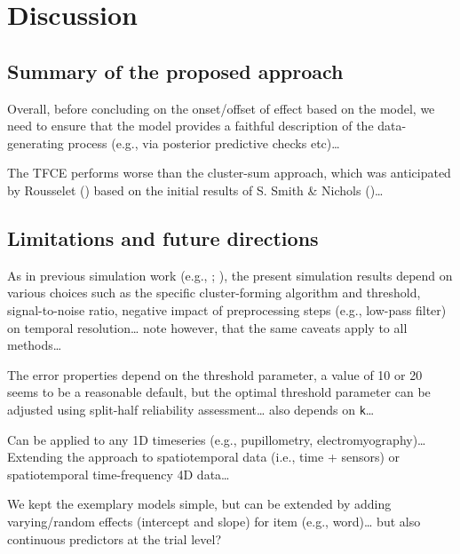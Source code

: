 \documentclass[
  man,
  floatsintext,
  longtable,
  a4paper,
  nolmodern,
  notxfonts,
  notimes,
  colorlinks=true,linkcolor=blue,citecolor=blue,urlcolor=blue]{apa7}
\begin{document}
\newpage

\section{Discussion}\label{discussion}

\subsection{Summary of the proposed
approach}\label{summary-of-the-proposed-approach}

Overall, before concluding on the onset/offset of effect based on the
model, we need to ensure that the model provides a faithful description
of the data-generating process (e.g., via posterior predictive checks
etc)\ldots{}

The TFCE performs worse than the cluster-sum approach, which was
anticipated by Rousselet ()
based on the initial results of S. Smith \& Nichols
()\ldots{}

\subsection{Limitations and future
directions}\label{limitations-and-future-directions}

As in previous simulation work (e.g.,
;
), the
present simulation results depend on various choices such as the
specific cluster-forming algorithm and threshold, signal-to-noise ratio,
negative impact of preprocessing steps (e.g., low-pass filter) on
temporal resolution\ldots{} note however, that the same caveats apply to
all methods\ldots{}

The error properties depend on the threshold parameter, a value of 10 or
20 seems to be a reasonable default, but the optimal threshold parameter
can be adjusted using split-half reliability assessment\ldots{} also
depends on \texttt{k}\ldots{}

Can be applied to any 1D timeseries (e.g., pupillometry,
electromyography)\ldots{} Extending the approach to spatiotemporal data
(i.e., time + sensors) or spatiotemporal time-frequency 4D data\ldots{}

We kept the exemplary models simple, but can be extended by adding
varying/random effects (intercept and slope) for item (e.g.,
word)\ldots{} but also continuous predictors at the trial level?
\end{document}
